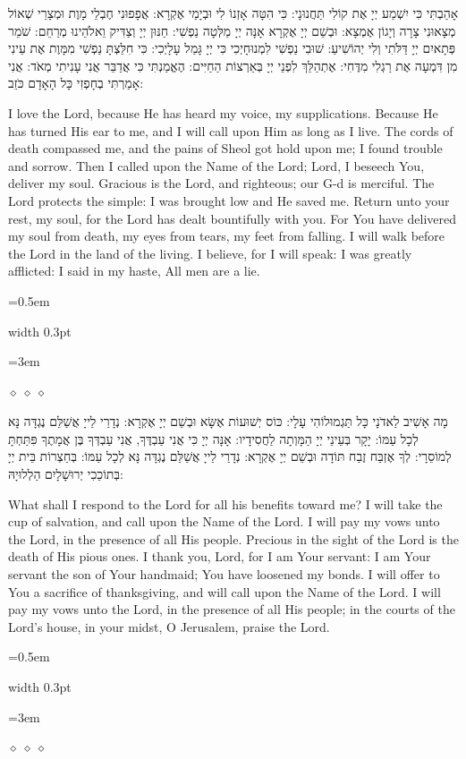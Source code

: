 \documentclass[11pt, openany]{book}
\newlength{\bidiHebWidth}
\newlength{\bidiEngWidth}
\newenvironment{bilingual}{%
  \par\vspace{4pt}%
}{%
  \noindent
  \begin{minipage}[t]{\bidiEngWidth}
    \setstretch{1.4}\emergencystretch=0.5em\normalsize
    \usebox{\bidiEngBox}
  \end{minipage}%
  \hfill
  {\color{sedergold}\vrule width 0.3pt}%
  \hfill
  \begin{minipage}[t]{\bidiHebWidth}
    \begingroup\hebrewfont\TeXXeTstate=1\beginR
    \large\setstretch{1.4}\emergencystretch=3em\tolerance=9999\parindent=0pt\relax
    \usebox{\bidiHebBox}
    \endR\endgroup
  \end{minipage}%
  \par\vspace{2pt}%
}
\newenvironment{hebrewcol}{%
  \begin{lrbox}{\bidiHebBox}\begin{minipage}{\bidiHebWidth}%
}{%
  \end{minipage}\end{lrbox}%
}
\newenvironment{englishcol}{%
  \begin{lrbox}{\bidiEngBox}\begin{minipage}{\bidiEngWidth}%
}{%
  \end{minipage}\end{lrbox}%
}
\newcommand{\parasep}{%
  \par\vspace{3pt}
  \begin{center}
    \textcolor{sedergold!50}{\tiny$\diamond\;\diamond\;\diamond$}
  \end{center}
  \par\vspace{3pt}
}
\begin{document}
\begin{bilingual}
\begin{hebrewcol}
אָהַבְתִּי כִּי יִשְׁמַע יְיָ אֶת קוֹלִי תַּחֲנוּנָי: כִּי הִטָּה אָזְנוֹ לִי וּבְיָמַי אֶקְרָא: אֲפָפוּנִי חֶבְלֵי מָוֶת וּמְצָרֵי שְׁאוֹל מְצָאוּנִי צָרָה וְיָגוֹן אֶמְצָא: וּבְשֵׁם יְיָ אֶקְרָא אָנָּה יְיָ מַלְּטָה נַפְשִׁי: חַנּוּן יְיָ וְצַדִּיק וֵאלֹהֵינוּ מְרַחֵם: שֹׁמֵר פְּתָאיִם יְיָ דַּלֹּתִי וְלִי יְהוֹשִׁיעַ: שׁוּבִי נַפְשִׁי לִמְנוּחָיְכִי כִּי יְיָ גָּמַל עָלָיְכִי: כִּי חִלַּצְתָּ נַפְשִׁי מִמָּוֶת אֶת עֵינִי מִן דִּמְעָה אֶת רַגְלִי מִדֶּחִי: אֶתְהַלֵּךְ לִפְנֵי יְיָ בְּאַרְצוֹת הַחַיִּים: הֶאֱמַנְתִּי כִּי אֲדַבֵּר אֲנִי עָנִיתִי מְאֹד: אֲנִי אָמַרְתִּי בְחָפְזִי כָּל הָאָדָם כֹּזֵב:
\end{hebrewcol}
\begin{englishcol}
I love the Lord, because He has heard my voice, my supplications. Because He has turned His ear to me, and I will  call upon Him as long as I live. The cords of death compassed me, and the pains of Sheol got hold upon me; I found trouble and sorrow. Then I called upon the Name of the Lord; Lord, I beseech You, deliver my soul. Gracious is the Lord, and righteous; our G-d is merciful. The Lord protects the simple: I was brought low and He saved me. Return unto your rest, my soul, for the Lord has dealt bountifully with you. For You have delivered my soul from death, my eyes from tears, my feet from falling. I will walk before the Lord in the land of the living. I believe, for I will speak: I was greatly afflicted: I said in my haste, All men are a lie.
\end{englishcol}
\end{bilingual}
\parasep

\begin{bilingual}
\begin{hebrewcol}
מָה אָשִׁיב לַאדֹנָי כָּל תַּגְמוּלוֹהִי עָלָי: כּוֹס יְשׁוּעוֹת אֶשָּׂא וּבְשֵׁם יְיָ אֶקְרָא: נְדָרַי לַייָ אֲשַׁלֵּם נֶגְדָּה נָּא לְכָל עַמּוֹ: יָקָר בְּעֵינֵי יְיָ הַמָּוְתָה לַחֲסִידָיו: אָנָּה יְיָ כִּי אֲנִי עַבְדֶּךָ, אֲנִי עַבְדְּךָ בֶּן אֲמָתֶךָ פִּתַּחְתָּ לְמוֹסֵרָי: לְךָ אֶזְבַּח זֶבַח תּוֹדָה וּבְשֵׁם יְיָ אֶקְרָא: נְדָרַי לַייָ אֲשַׁלֵּם נֶגְדָּה נָּא לְכָל עַמּוֹ: בְּחַצְרוֹת בֵּית יְיָ בְּתוֹכֵכִי יְרוּשָׁלָיִם הַלְלוּיָהּ:
\end{hebrewcol}
\begin{englishcol}
What shall I respond to the Lord for all his benefits toward me? I will take the cup of salvation, and call upon the Name of the Lord. I will pay my vows unto the Lord, in the presence of all His people. Precious in the sight of the Lord is the death of His pious ones. I thank you, Lord, for I am Your servant: I am Your servant the son of Your handmaid; You have loosened my bonds. I will offer to You a sacrifice of thanksgiving, and will call upon the Name of the Lord. I will pay my vows unto the Lord, in the presence of all His people; in the courts of the Lord's house, in your midst, O Jerusalem, praise the Lord.
\end{englishcol}
\end{bilingual}
\parasep
\end{document}

